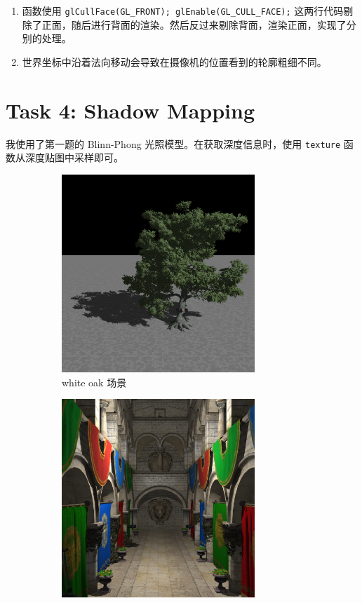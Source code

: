 \documentclass[UTF8]{ctexart}
\begin{document}
\begin{enumerate}
    \item 函数使用 \texttt{glCullFace(GL\_FRONT); glEnable(GL\_CULL\_FACE);} 这两行代码剔除了正面，随后进行背面的渲染。然后反过来剔除背面，渲染正面，实现了分别的处理。
    \item 世界坐标中沿着法向移动会导致在摄像机的位置看到的轮廓粗细不同。
\end{enumerate}

\section*{Task 4: Shadow Mapping}

我使用了第一题的 Blinn-Phong 光照模型。在获取深度信息时，使用 \texttt{texture} 函数从深度贴图中采样即可。

\begin{figure}[htbp]
    \begin{subfigure}[b]{0.49\textwidth}
        \centering
        \includegraphics[width=0.8\textwidth]{images/4-1.png}
        \caption{white oak 场景}
    \end{subfigure}
    \hfill
    \begin{subfigure}[b]{0.49\textwidth}
        \centering
        \includegraphics[width=0.8\textwidth]{images/4-2.png}

\end{subfigure}
\end{figure}
\end{document}
